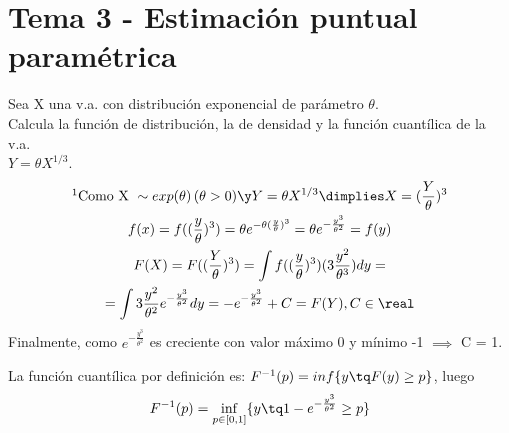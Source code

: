 \newpage
\section{Tema 3 - Estimación puntual paramétrica}

\begin{problem}[1]
Sea X una v.a. con distribución exponencial de parámetro $\theta$.\\
Calcula la función de distribución, la de densidad y la función cuantílica de la v.a.\\
$ Y = \theta X^{1/3} $.
\solution
\begin{gather*}
\footnotemark\text{Como X }\sim exp(\theta) \,(\theta > 0) \y Y = \theta X^{1/3} \dimplies X = (\frac{Y}{\theta})^{3}\\
f(x) = f((\frac{y}{\theta})^3) =
\theta e^{-\theta (\frac{y}{\theta})^3} =
\theta e^{-\frac{y^3}{\theta^2}} =
f(y) \\
F(X) = F((\frac{Y}{\theta})^{3}) =
\int f((\frac{y}{\theta})^{3}) (3\frac{y^2}{\theta^3}) dy =\\
= \int 3\frac{y^2}{\theta^2} e^{-\frac{y^3}{\theta^2}} dy =
- e^{-\frac{y^3}{\theta^2}} + C = F(Y),  C \in \real
\end{gather*}
Finalmente, como $ e^{-\frac{y^3}{\theta^2}} $ es creciente con valor máximo 0 y mínimo -1 $ \implies $ C = 1.

La función cuantílica por definición es: $ F^{-1}(p) = inf\{y \tq F(y) \geq p\} $, luego
\[
F^{-1}(p) = \inf_{p \in [0,1]}\{ y \tq 1 - e^{-\frac{y^3}{\theta^2}} \geq p \}
\]

\end{problem}

